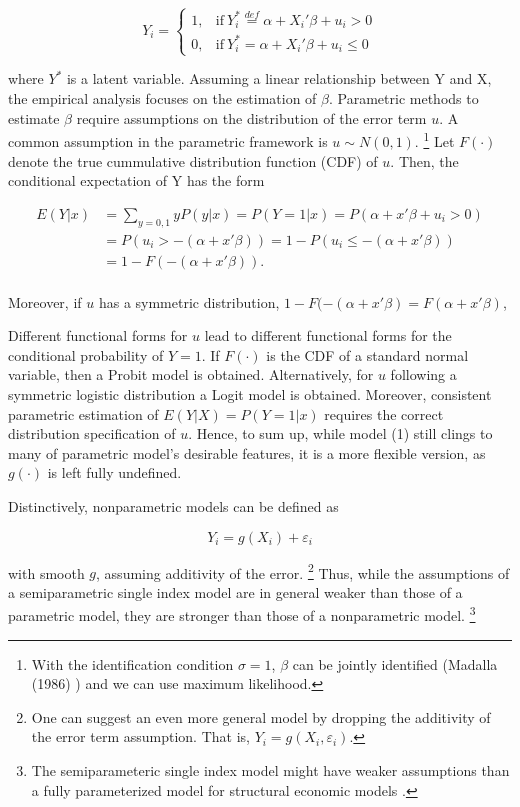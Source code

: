 \documentclass[a4paper]{article}
\begin{document}
\[
    Y_i = 
    \begin{cases}
      1, & \text{if}\ Y_i^* \stackrel{def}{=} \alpha + X_i'\beta + u_i > 0 \\
      0, & \text{if}\ Y_i^* = \alpha + X_i'\beta + u_i \leq 0
    \end{cases}
\]

where $Y^{*}$ is a latent variable.
Assuming a linear relationship between Y and X, the empirical analysis focuses on the estimation of $\beta$.
Parametric methods to estimate $\beta$ require assumptions on the distribution of the error term $u$. A common assumption in the parametric framework is $ u \sim N(0, 1)$. \footnote{With the identification condition $\sigma = 1$, $\beta$ can be jointly identified (Madalla (1986) \cite{[2]}) and we can use maximum likelihood.}  Let $F(\cdot)$ denote the true cummulative distribution function (CDF) of $u$. Then, the conditional expectation of Y has the form

\[ 
\begin{split}
E(Y|x) & = \sum_{y=0,1} yP(y|x) = P(Y=1|x) = P(\alpha + x'\beta + u_i > 0) \\
 & = P(u_i > -(\alpha + x'\beta)) = 1 - P(u_i \leq -(\alpha + x'\beta)) \\
 & = 1 - F(-(\alpha + x'\beta)). \\
\end{split}
\]


Moreover, if $u$ has a symmetric distribution, $1 - F(-(\alpha + x'\beta) = F(\alpha + x'\beta)$, 

Different functional forms for $u$ lead to different functional forms for the conditional probability of $Y = 1$. If $F(\cdot)$ is the CDF of a standard normal variable, then a Probit model is obtained. Alternatively, for $u$ following a symmetric logistic distribution a Logit model is obtained. Moreover, consistent parametric estimation of $E(Y|X) = P(Y=1|x)$ requires the correct distribution specification of $u$. 
Hence, to sum up, while model (1) still clings to many of parametric model's desirable features, it is a more flexible version, as $g(\cdot)$ is left fully undefined.

Distinctively, nonparametric models can be defined as
  
\[Y_i = g(X_i) + \varepsilon_i\]

with smooth $g$, assuming additivity of the error. \footnote{One can suggest an even more general model by dropping the additivity of the error term assumption. That is, $Y_i = g(X_i, \varepsilon_i) $. } Thus, while the assumptions of a semiparametric single index model are in general weaker than those of a parametric model, they are stronger than those of a nonparametric model. \footnote{The semiparameteric single index model might have weaker assumptions than a fully parameterized model for structural economic models \cite{[13]}.} 
\end{document}
